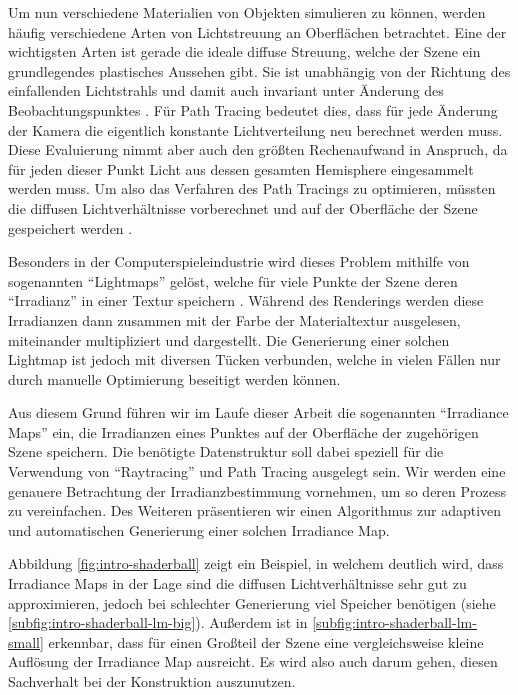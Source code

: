 	Um nun verschiedene Materialien von Objekten simulieren zu können, werden häufig verschiedene Arten von Lichtstreuung an Oberflächen betrachtet.
	Eine der wichtigsten Arten ist gerade die ideale diffuse Streuung, welche der Szene ein grundlegendes plastisches Aussehen gibt.
	Sie ist unabhängig von der Richtung des einfallenden Lichtstrahls und damit auch invariant unter Änderung des Beobachtungspunktes \cite{intro-radiometry}.
	Für Path Tracing bedeutet dies, dass für jede Änderung der Kamera die eigentlich konstante Lichtverteilung neu berechnet werden muss.
	Diese Evaluierung nimmt aber auch den größten Rechenaufwand in Anspruch, da für jeden dieser Punkt Licht aus dessen gesamten Hemisphere eingesammelt werden muss.
	Um also das Verfahren des Path Tracings zu optimieren, müssten die diffusen Lichtverhältnisse vorberechnet und auf der Oberfläche der Szene gespeichert werden \cite{irradiance-caching}.

	Besonders in der Computerspieleindustrie wird dieses Problem mithilfe von sogenannten \enquote{Lightmaps} gelöst, welche für viele Punkte der Szene deren \enquote{Irradianz} in einer Textur speichern \cite{tricks-game}.
	Während des Renderings werden diese Irradianzen dann zusammen mit der Farbe der Materialtextur ausgelesen, miteinander multipliziert und dargestellt.
	Die Generierung einer solchen Lightmap ist jedoch mit diversen Tücken verbunden, welche in vielen Fällen nur durch manuelle Optimierung beseitigt werden können.

	Aus diesem Grund führen wir im Laufe dieser Arbeit die sogenannten \enquote{Irradiance Maps} ein, die Irradianzen eines Punktes auf der Oberfläche der zugehörigen Szene speichern.
	Die benötigte Datenstruktur soll dabei speziell für die Verwendung von \enquote{Raytracing} und Path Tracing ausgelegt sein.
	Wir werden eine genauere Betrachtung der Irradianzbestimmung vornehmen, um so deren Prozess zu vereinfachen.
	Des Weiteren präsentieren wir einen Algorithmus zur adaptiven und automatischen Generierung einer solchen Irradiance Map.

	Abbildung \ref{fig:intro-shaderball} zeigt ein Beispiel, in welchem deutlich wird, dass Irradiance Maps in der Lage sind die diffusen Lichtverhältnisse sehr gut zu approximieren, jedoch bei schlechter Generierung viel Speicher benötigen (siehe \ref{subfig:intro-shaderball-lm-big}).
	Außerdem ist in \ref{subfig:intro-shaderball-lm-small} erkennbar, dass für einen Großteil der Szene eine vergleichsweise kleine Auflösung der Irradiance Map ausreicht.
	Es wird also auch darum gehen, diesen Sachverhalt bei der Konstruktion auszunutzen.

